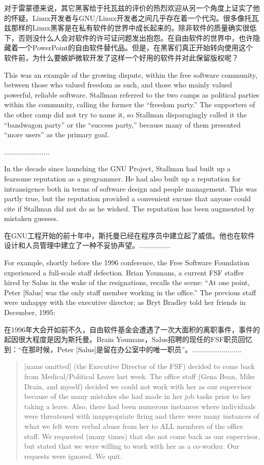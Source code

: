 \ifdefined\chs
对于雷蒙德来说，其它黑客给于托瓦兹的评价的热烈欢迎从另一个角度上证实了他的怀疑。Linux开发者与GNU/Linux开发者之间几乎存在着一个代沟。很多像托瓦兹那样的Linux黑客是在私有软件的世界中成长起来的。除非软件的质量确实很低下，否则没什么人会对软件的许可证问题发出抱怨。在自由软件的世界中，也许隐藏着一个PowerPoint的自由软件替代品。但是，在黑客们真正开始转向使用这个软件前，为什么要嫉妒微软开发了这样一个好用的软件并对此保留版权呢？
\fi

\ifdefined\eng
This was an example of the growing dispute, within the free software community, between those who valued freedom as such, and those who mainly valued powerful, reliable software.  Stallman referred to the two camps as political parties within the community, calling the former the ``freedom party.''  The supporters of the other camp did not try to name it, so Stallman disparagingly called it the ``bandwagon party'' or the ``success party,'' because many of them presented ``more
users'' as the primary goal.
\fi

\ifdefined\chs
.......................
\fi

\ifdefined\eng
In the decade since launching the GNU Project, Stallman had built up a fearsome reputation as a programmer. He had also built up a reputation for intransigence both in terms of software design and people management. This was partly true, but the reputation provided a convenient excuse that anyone could cite if Stallman did not do as he wished.  The reputation has been augmented by mistaken guesses.
\fi

\ifdefined\chs
在GNU工程开始的前十年中，斯托曼已经在程序员中建立起了威信。他也在软件设计和人员管理中建立了一种不妥协声望。................
\fi

\ifdefined\eng
For example, shortly before the 1996 conference, the Free Software Foundation experienced a full-scale staff defection.  Brian Youmans, a current FSF staffer hired by Salus in the wake of the resignations, recalls the scene: ``At one point, Peter [Salus] was the only staff member working in the office.''  The previous staff were unhappy with the executive director; as Bryt Bradley told her friends in December, 1995:
\fi

\ifdefined\chs
在1996年大会开如前不久，自由软件基金会遭遇了一次大面积的离职事件，事件的起因很大程度是因为斯托曼。Brain Youmans，Salus招聘的现任的FSF职员回忆到：“在那时候，Peter [Salus]是留在办公室中的唯一职员”。.........................
\fi

\ifdefined\eng
\begin{quote}
[name omitted] (the Executive Director of the FSF) decided to come back from Medical/Political Leave last week. The office staff (Gena Bean, Mike Drain, and myself) decided we could not work with her as our supervisor because of the many mistakes she had made in her job tasks prior to her taking a leave.  Also, there had been numerous instances where individuals were threatened with inappropriate firing and there  were many instances of what we felt were verbal abuse from her to ALL members of the office staff.  We requested (many times) that she not come back as our supervisor, but stated that we were willing to work with her as a co-worker.  Our requests were ignored.  We quit.
\end{quote}
\fi

